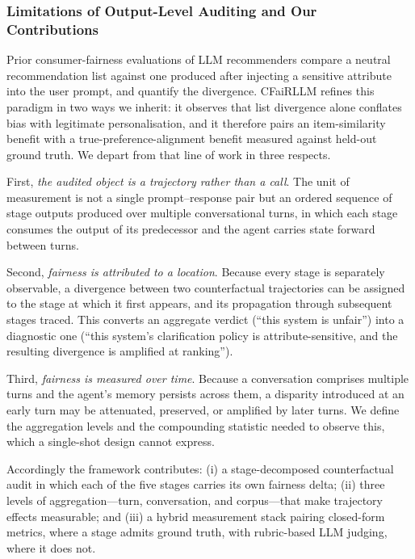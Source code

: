 \documentclass[manuscript,screen,review]{acmart}
\begin{document}
\subsubsection{Limitations of Output-Level Auditing and Our Contributions}
\label{sec:limitations}

Prior consumer-fairness evaluations of LLM recommenders compare a neutral
recommendation list against one produced after injecting a sensitive attribute
into the user prompt, and quantify the divergence. CFaiRLLM refines this paradigm
in two ways we inherit: it observes that list divergence alone conflates bias
with legitimate personalisation, and it therefore pairs an item-similarity
benefit with a true-preference-alignment benefit measured against held-out ground
truth. We depart from that line of work in three respects.

First, \emph{the audited object is a trajectory rather than a call}. The unit of
measurement is not a single prompt--response pair but an ordered sequence of
stage outputs produced over multiple conversational turns, in which each stage
consumes the output of its predecessor and the agent carries state forward
between turns.

Second, \emph{fairness is attributed to a location}. Because every stage is
separately observable, a divergence between two counterfactual trajectories can
be assigned to the stage at which it first appears, and its propagation through
subsequent stages traced. This converts an aggregate verdict (``this system is
unfair'') into a diagnostic one (``this system's clarification policy is
attribute-sensitive, and the resulting divergence is amplified at ranking'').

Third, \emph{fairness is measured over time}. Because a conversation comprises
multiple turns and the agent's memory persists across them, a disparity
introduced at an early turn may be attenuated, preserved, or amplified by later
turns. We define the aggregation levels and the compounding statistic needed to
observe this, which a single-shot design cannot express.

Accordingly the framework contributes: (i) a stage-decomposed counterfactual
audit in which each of the five stages carries its own fairness delta; (ii) three
levels of aggregation---turn, conversation, and corpus---that make trajectory
effects measurable; and (iii) a hybrid measurement stack pairing closed-form
metrics, where a stage admits ground truth, with rubric-based LLM judging, where
it does not.
\end{document}
